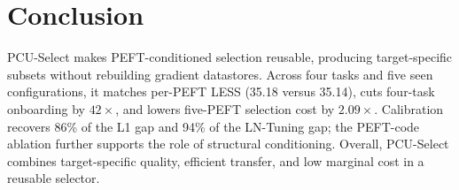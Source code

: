 \section{Conclusion}

PCU-Select makes PEFT-conditioned selection reusable, producing target-specific subsets without rebuilding gradient datastores. Across four tasks and five seen configurations, it matches per-PEFT LESS (35.18 versus 35.14), cuts four-task onboarding by $42\times$, and lowers five-PEFT selection cost by $2.09\times$. Calibration recovers 86\% of the L1 gap and 94\% of the LN-Tuning gap; the PEFT-code ablation further supports the role of structural conditioning. Overall, PCU-Select combines target-specific quality, efficient transfer, and low marginal cost in a reusable selector.
